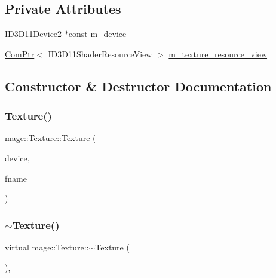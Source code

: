 \subsection*{Private Attributes}
\begin{DoxyCompactItemize}
\item 
I\+D3\+D11\+Device2 $\ast$const \hyperlink{classmage_1_1_texture_ad5409f37b321649bc1a12bcee8eb661b}{m\+\_\+device}
\item 
\hyperlink{namespacemage_ae74f374780900893caa5555d1031fd79}{Com\+Ptr}$<$ I\+D3\+D11\+Shader\+Resource\+View $>$ \hyperlink{classmage_1_1_texture_a3de1d2d744e7bb276b0f66d72640e423}{m\+\_\+texture\+\_\+resource\+\_\+view}
\end{DoxyCompactItemize}


\subsection{Constructor \& Destructor Documentation}
\hypertarget{classmage_1_1_texture_a680c4df56476b4c66c1e2ffd5bef63c2}{}\label{classmage_1_1_texture_a680c4df56476b4c66c1e2ffd5bef63c2} 
\subsubsection{\texorpdfstring{Texture()}{Texture()}\hspace{0.1cm}{\footnotesize\ttfamily [1/3]}}
{\footnotesize\ttfamily mage\+::\+Texture\+::\+Texture (\begin{DoxyParamCaption}\item[{I\+D3\+D11\+Device2 $\ast$}]{device,  }\item[{const wstring \&}]{fname }\end{DoxyParamCaption})}

\hypertarget{classmage_1_1_texture_a81664804ac0259e8c67851409ee106fa}{}\label{classmage_1_1_texture_a81664804ac0259e8c67851409ee106fa} 
\subsubsection{\texorpdfstring{$\sim$\+Texture()}{~Texture()}}
{\footnotesize\ttfamily virtual mage\+::\+Texture\+::$\sim$\+Texture (\begin{DoxyParamCaption}{ }\end{DoxyParamCaption})\hspace{0.3cm}{\ttfamily [virtual]}, {\ttfamily [default]}}

